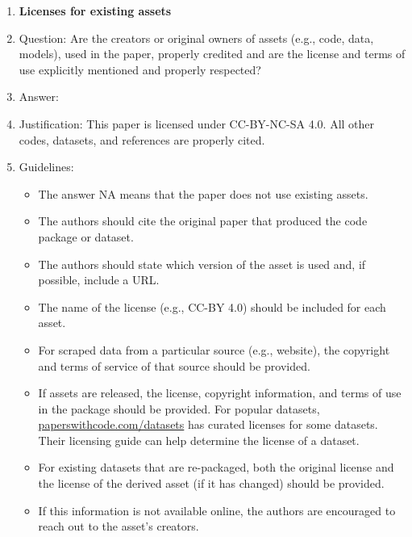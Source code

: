 \documentclass{article}
\theoremstyle{plain}
\theoremstyle{definition}
\theoremstyle{remark}
\begin{document}
\begin{enumerate}
\item {\bf Licenses for existing assets}
    \item[] Question: Are the creators or original owners of assets (e.g., code, data, models), used in the paper, properly credited and are the license and terms of use explicitly mentioned and properly respected?
    \item[] Answer:\answerYes{}%
    \item[] Justification: This paper is licensed under CC-BY-NC-SA 4.0. All other codes, datasets, and
references are properly cited.
    \item[] Guidelines:
    \begin{itemize}
        \item The answer NA means that the paper does not use existing assets.
        \item The authors should cite the original paper that produced the code package or dataset.
        \item The authors should state which version of the asset is used and, if possible, include a URL.
        \item The name of the license (e.g., CC-BY 4.0) should be included for each asset.
        \item For scraped data from a particular source (e.g., website), the copyright and terms of service of that source should be provided.
        \item If assets are released, the license, copyright information, and terms of use in the package should be provided. For popular datasets, \url{paperswithcode.com/datasets} has curated licenses for some datasets. Their licensing guide can help determine the license of a dataset.
        \item For existing datasets that are re-packaged, both the original license and the license of the derived asset (if it has changed) should be provided.
        \item If this information is not available online, the authors are encouraged to reach out to the asset's creators.
    \end{itemize}


\end{enumerate}
\end{document}
